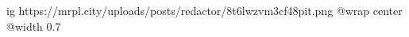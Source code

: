  
 
 
 
 

\ifcmt
  ig https://mrpl.city/uploads/posts/redactor/8t6lwzvm3cf48pit.png
  @wrap center
  @width 0.7
\fi
